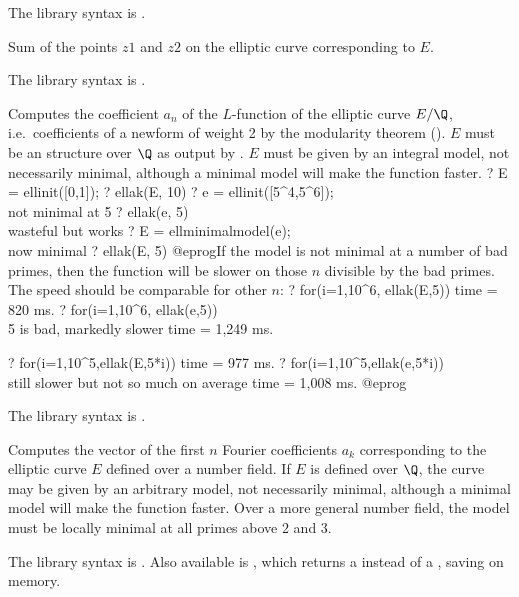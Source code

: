 The library syntax is .

\label{se:elladd}
Sum of the points $z1$ and $z2$ on the
elliptic curve corresponding to $E$.

The library syntax is .

\label{se:ellak}
Computes the coefficient $a_n$ of the $L$-function of the elliptic curve
$E/\Q$, i.e.~coefficients of a newform of weight 2 by the modularity theorem
(). $E$ must be an  structure
over $\Q$ as output by . $E$ must be given by an integral model,
not necessarily minimal, although a minimal model will make the function
faster.
\bprog
? E = ellinit([0,1]);
? ellak(E, 10)
? e = ellinit([5^4,5^6]); \\ not minimal at 5
? ellak(e, 5) \\ wasteful but works
? E = ellminimalmodel(e); \\ now minimal
? ellak(E, 5)
@eprog\noindent If the model is not minimal at a number of bad primes, then
the function will be slower on those $n$ divisible by the bad primes.
The speed should be comparable for other $n$:
\bprog
? for(i=1,10^6, ellak(E,5))
time = 820 ms.
? for(i=1,10^6, ellak(e,5)) \\ 5 is bad, markedly slower
time = 1,249 ms.

? for(i=1,10^5,ellak(E,5*i))
time = 977 ms.
? for(i=1,10^5,ellak(e,5*i)) \\ still slower but not so much on average
time = 1,008 ms.
@eprog

The library syntax is .

\label{se:ellan}
Computes the vector of the first $n$ Fourier coefficients $a_k$
corresponding to the elliptic curve $E$ defined over a number field.
If $E$ is defined over $\Q$, the curve may be given by an
arbitrary model, not necessarily minimal,
although a minimal model will make the function faster. Over a more general
number field, the model must be locally minimal at all primes above $2$
and $3$.

The library syntax is .
Also available is , which
returns a  instead of a , saving on memory.

